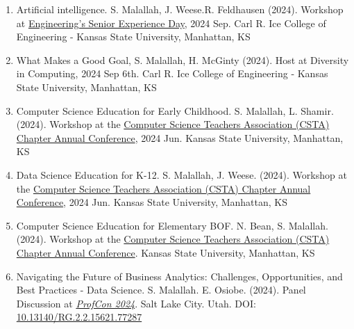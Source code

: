 \documentclass[11pt]{article}
\begin{document}
\begin{enumerate}
\item Artificial intelligence. S. Malallah, J. Weese.R. Feldhausen  (2024). Workshop at  \href{https://engg.k-state.edu/senior-experience-day/}{Engineering’s Senior Experience Day}, 2024 Sep. Carl R. Ice College of Engineering - Kansas State University, Manhattan, KS   {\href{https://www.linkedin.com/posts/safiamalallah_i-am-happy-to-have-facilitated-an-engaging-activity-7242966364993323008-NAQr?utm_source=share&utm_medium=member_desktop}{\color{icnclr} \faGlobe[regular]  }}

\item What Makes a Good Goal, S. Malallah, H. McGinty  (2024). Host at  Diversity in Computing, 2024 Sep 6th. Carl R. Ice College of Engineering - Kansas State University, Manhattan, KS   {\href{https://ksuemailprod-my.sharepoint.com/:b:/g/personal/safia_ksu_edu/EezK-s2HbFROvmHt65ljAz4BevuIKAB-Xjvl-w1K8wzOyQ?e=1wiEmx}{\color{icnclr} \faFilePdf[regular]  }}


\item Computer Science Education for Early Childhood. S. Malallah, L. Shamir. (2024). Workshop at the \href{https://alt.cs.ksu.edu/cs4ks2024/}{Computer Science Teachers Association (CSTA) Chapter Annual Conference}, 2024 Jun. Kansas State University, Manhattan, KS   {\href{https://www.youtube.com/watch?v=l7GRY_xQB4w}{\color{icnclr} \faCaretSquareRight[regular]  }}



\item  Data Science Education for K-12. S. Malallah, J. Weese. (2024). Workshop at the \href{https://alt.cs.ksu.edu/cs4ks2024/}{Computer Science Teachers Association (CSTA) Chapter Annual Conference}, 2024 Jun. Kansas State University, Manhattan, KS   {\href{https://www.youtube.com/watch?v=InEI8MIgOQ4}{\color{icnclr} \faCaretSquareRight[regular]  }}


\item  Computer Science Education for Elementary BOF. N. Bean, S. Malallah. (2024). Workshop at the \href{https://alt.cs.ksu.edu/cs4ks2024/}{Computer Science Teachers Association (CSTA) Chapter Annual Conference}. Kansas State University, Manhattan, KS  {\href{https://www.youtube.com/watch?v=UC0Ti_S267Q}{\color{icnclr} \faCaretSquareRight[regular]  }}
 
\item  Navigating the Future of Business Analytics: Challenges, Opportunities, and Best Practices - Data Science. S. Malallah. E. Osiobe. (2024). Panel Discussion at \textit{ {\href{https://www.stukent.com/profcon-2024-agenda/}{ProfCon 2024}}}. Salt Lake City. Utah. DOI: \href{https://doi.org/10.13140/RG.2.2.15621.77287}{10.13140/RG.2.2.15621.77287} {\href{https://drive.google.com/file/d/1OquyckRjU0ML1gdGrjtBWdm_GyXpzJiv/view}{\color{icnclr} \faCaretSquareRight[regular]  }}


\end{enumerate}
\end{document}
